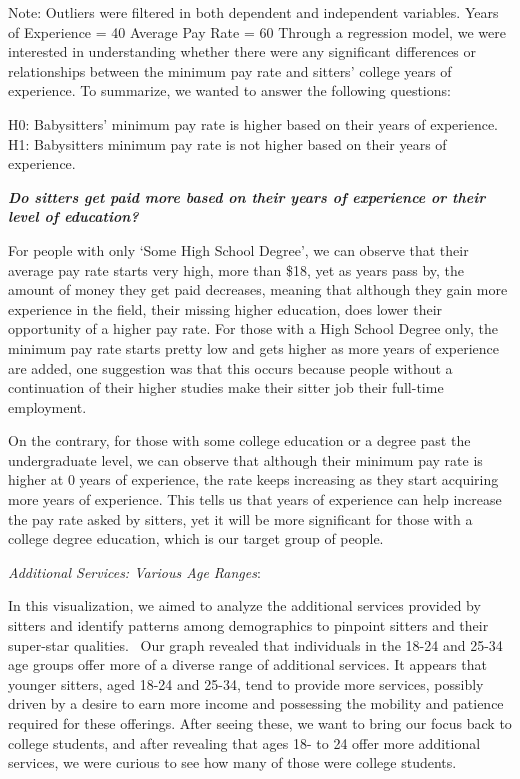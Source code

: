 \documentclass[12pt]{article}
\begin{document}
Note: Outliers were filtered in both dependent and independent
variables. Years of Experience = 40 Average Pay Rate = 60
\newpage Through a regression model, we were interested in understanding
whether there were any significant differences or relationships between
the minimum pay rate and sitters' college years of experience. To
summarize, we wanted to answer the following questions:

H0: Babysitters' minimum pay rate is higher based on their years of
experience. H1: Babysitters minimum pay rate is not higher based on
their years of experience.

\textbf{\emph{Do sitters get paid more based on their years of
experience or their level of education?}}

For people with only `Some High School Degree', we can observe that
their average pay rate starts very high, more than \$18, yet as years
pass by, the amount of money they get paid decreases, meaning that
although they gain more experience in the field, their missing higher
education, does lower their opportunity of a higher pay rate. For those
with a High School Degree only, the minimum pay rate starts pretty low
and gets higher as more years of experience are added, one suggestion
was that this occurs because people without a continuation of their
higher studies make their sitter job their full-time employment.

On the contrary, for those with some college education or a degree past
the undergraduate level, we can observe that although their minimum pay
rate is higher at 0 years of experience, the rate keeps increasing as
they start acquiring more years of experience. This tells us that years
of experience can help increase the pay rate asked by sitters, yet it
will be more significant for those with a college degree education,
which is our target group of people.

\newpage

\emph{Additional Services: Various Age Ranges}:

In this visualization, we aimed to analyze the additional services
provided by sitters and identify patterns among demographics to pinpoint
sitters and their super-star qualities.~ Our graph revealed that
individuals in the 18-24 and 25-34 age groups offer more of a diverse
range of additional services. It appears that younger sitters, aged
18-24 and 25-34, tend to provide more services, possibly driven by a
desire to earn more income and possessing the mobility and patience
required for these offerings. After seeing these, we want to bring our
focus back to college students, and after revealing that ages 18- to 24
offer more additional services, we were curious to see how many of those
were college students.
\end{document}

